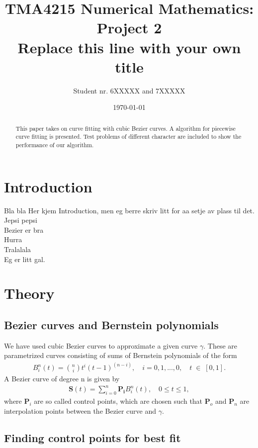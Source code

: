\documentclass[10pt]{article}
\title{TMA4215 Numerical Mathematics: Project 2 \\ Replace this line with your own title}
\author{Student nr. 6XXXXX and 7XXXXX} %
\date{\today}
\begin{document}
\maketitle
\begin{abstract}
This paper takes on curve fitting with cubic Bezier curves. A algorithm for piecewise curve fitting is presented. Test problems of different character are included to show the performance of our algorithm.
\end{abstract}

\section*{Introduction} 

Bla bla Her kjem Introduction, men eg berre skriv litt for aa setje av plass til det. \\
Jepsi pepsi \\
Bezier er bra \\
Hurra \\
Tralalala \\
Eg er litt gal. \\


\section*{Theory}

\subsection*{Bezier curves and Bernstein polynomials}

We have used cubic Bezier curves to approximate a given curve $\gamma$. These are parametrized curves consisting of sums of Bernstein polynomials of the form
\begin{align}
B_{i}^n(t) = \binom{n}{i}t^i(t-1)^{(n-i)},\quad i = 0, 1, ..., 0,\quad t \; \in \; [0,1].
\end{align}
A Bezier curve of degree n is given by
\begin{align}
\mathbf{S}(t) = \sum_{i=0}^{n} \mathbf{P_i} B_{i}^n(t), \quad 0 \leq t \leq 1,
\end{align}
where $\mathbf{P}_i$ are so called control points, which are chosen such that $\mathbf{P}_o$ and $\mathbf{P}_n$ are interpolation points between the Bezier curve and $\gamma$.


\subsection*{Finding control points for best fit}
\end{document}
